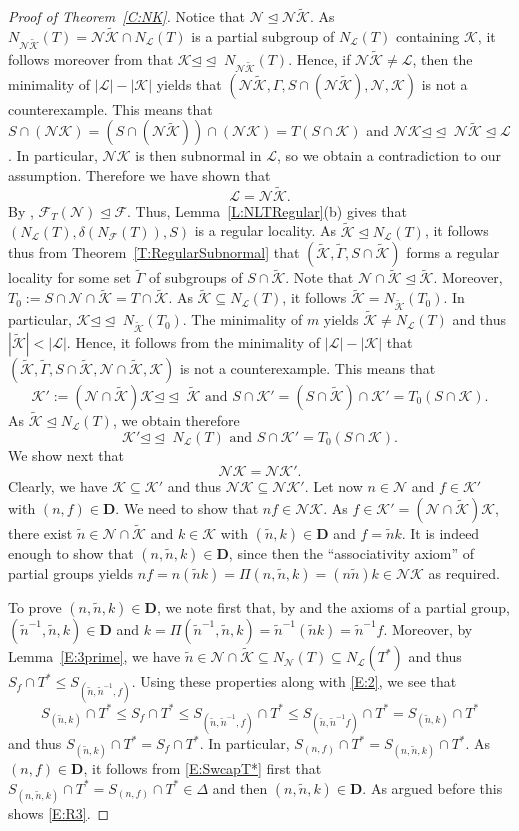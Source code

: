 \documentclass[reqno,11pt]{amsart}
\numberwithin{equation}{section}
\theoremstyle{definition}
\newcommand{\F}{\mathcal{F}}
\renewcommand{\L}{\mathcal{L}}
\newcommand{\tGamma}{\tilde{\Gamma}}
\newcommand{\tK}{\tilde{\mathcal{K}}}
\newcommand{\tn}{\tilde{n}}
\newcommand{\N}{\mathcal{N}}
\newcommand{\K}{\mathcal{K}}
\newcommand{\D}{\mathbf{D}}
\newcommand{\subn}{{\unlhd\!\unlhd\;}}
\begin{document}
\begin{proof}[Proof of Theorem~\ref{C:NK}]
Notice that $\N\unlhd\N\tK$. As $N_{\N\tK}(T)=\N\tK\cap N_\L(T)$ is a partial subgroup of $N_\L(T)$ containing $\K$, it follows moreover from \cite[Lemma~3.7(a)]{Henke:Regular} that $\K\subn N_{\N\tK}(T)$. Hence, if $\N\tK\neq \L$, then the minimality of $|\L|-|\K|$ yields that $(\N\tK,\Gamma,S\cap(\N\tK),\N,\K)$ is not a counterexample. This means that $S\cap (\N\K)=(S\cap(\N\tK))\cap (\N\K)=T(S\cap\K)$ and $\N\K\subn\N\tK\unlhd\L$. In particular, $\N\K$ is then subnormal in $\L$, so we obtain a contradiction to our assumption. Therefore we have shown that
\begin{equation}\label{E:R1}
\L=\N\tK.
\end{equation}
By \cite[Theorem~A]{Chermak/Henke}, $\F_T(\N)\unlhd\F$. Thus, Lemma~\ref{L:NLTRegular}(b) gives that $(N_\L(T),\delta(N_\F(T)),S)$ is a regular locality. As $\tK\unlhd N_\L(T)$, it follows thus from Theorem~\ref{T:RegularSubnormal} that $(\tK,\tGamma,S\cap\tK)$ forms a regular locality for some set $\tGamma$ of subgroups of $S\cap \tK$. Note that $\N\cap\tK\unlhd\tK$. Moreover, $T_0:=S\cap \N\cap\tK=T\cap\tK$. As $\tK\subseteq N_\L(T)$, it follows $\tK=N_{\tK}(T_0)$. In particular, $\K\subn N_{\tK}(T_0)$. The minimality of $m$ yields $\tK\neq N_\L(T)$ and thus $|\tK|<|\L|$. Hence, it follows from the minimality of $|\L|-|\K|$ that $(\tK,\tGamma,S\cap\tK,\N\cap\tK,\K)$ is not a counterexample. This means that
\[\K':=(\N\cap \tK)\K\subn\tK\mbox{ and }S\cap \K'=(S\cap\tK)\cap \K'=T_0(S\cap\K).\]
As $\tK\unlhd N_\L(T)$, we obtain therefore
\begin{equation}\label{E:R2}
\K'\subn N_\L(T)\mbox{ and }S\cap\K'=T_0(S\cap\K).
\end{equation}
  We show next that
\begin{equation}\label{E:R3}
 \N\K=\N\K'.
\end{equation}
Clearly, we have $\K\subseteq\K'$ and thus $\N\K\subseteq\N\K'$. Let now $n\in\N$ and $f\in\K'$ with $(n,f)\in\D$. We need to show that $nf\in\N\K$. As $f\in\K'=(\N\cap\tK)\K$, there exist $\tn\in\N\cap\tK$ and $k\in\K$ with $(\tn,k)\in\D$ and $f=\tn k$. It is indeed enough to show that $(n,\tn,k)\in\D$, since then the ``associativity axiom'' of partial groups yields $nf=n(\tn k)=\Pi(n,\tn,k)=(n\tn)k\in\N\K$ as required.

\smallskip

To prove $(n,\tn,k)\in\D$, we note first that, by \cite[Lemma~1.4(d)]{Chermak:2015} and the axioms of a partial group, $(\tn^{-1},\tn,k)\in\D$ and $k=\Pi(\tn^{-1},\tn,k)=\tn^{-1}(\tn k)=\tn^{-1}f$. Moreover, by Lemma~\ref{E:3prime}, we have $\tn\in\N\cap\tK\subseteq N_\N(T)\subseteq N_\L(T^*)$ and thus $S_f\cap T^*\leq S_{(\tn,\tn^{-1},f)}$. Using these properties along with \eqref{E:2}, we see that
\[S_{(\tn,k)}\cap T^*\leq S_f\cap T^*\leq S_{(\tn,\tn^{-1},f)}\cap T^*\leq S_{(\tn,\tn^{-1}f)}\cap T^*=S_{(\tn,k)}\cap T^*\]
and thus $S_{(\tn,k)}\cap T^*=S_f\cap T^*$. In particular, $S_{(n,f)}\cap T^*=S_{(n,\tn,k)}\cap T^*$. As $(n,f)\in\D$, it follows from \eqref{E:SwcapT*} first that $S_{(n,\tn,k)}\cap T^*=S_{(n,f)}\cap T^*\in\Delta$ and then $(n,\tn,k)\in\D$. As argued before this shows \eqref{E:R3}.


\end{proof}
\end{document}
